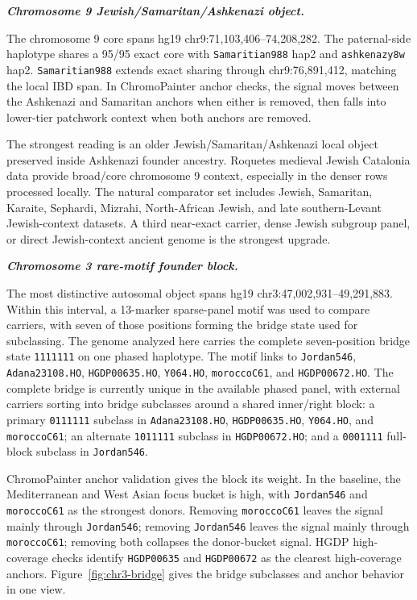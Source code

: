 \documentclass[11pt]{article}
\newcommand{\objectheading}[1]{%
  \par\addvspace{0.9\baselineskip}%
  \noindent\textbf{\textit{#1}}\par\nopagebreak\smallskip\noindent%
}
\begin{document}
\objectheading{Chromosome 9 Jewish/Samaritan/Ashkenazi object.}
The chromosome 9 core spans hg19 chr9:71,103,406--74,208,282. The paternal-side haplotype shares a 95/95 exact core with \texttt{Samaritian988} hap2 and \texttt{ashkenazy8w} hap2. \texttt{Samaritian988} extends exact sharing through chr9:76,891,412, matching the local IBD span. In ChromoPainter anchor checks, the signal moves between the Ashkenazi and Samaritan anchors when either is removed, then falls into lower-tier patchwork context when both anchors are removed.

The strongest reading is an older Jewish/Samaritan/Ashkenazi local object preserved inside Ashkenazi founder ancestry. Roquetes medieval Jewish Catalonia data provide broad/core chromosome 9 context, especially in the denser rows processed locally. The natural comparator set includes Jewish, Samaritan, Karaite, Sephardi, Mizrahi, North-African Jewish, and late southern-Levant Jewish-context datasets. A third near-exact carrier, dense Jewish subgroup panel, or direct Jewish-context ancient genome is the strongest upgrade.

\objectheading{Chromosome 3 rare-motif founder block.}
The most distinctive autosomal object spans hg19 chr3:47,002,931--49,291,883. Within this interval, a 13-marker sparse-panel motif was used to compare carriers, with seven of those positions forming the bridge state used for subclassing. The genome analyzed here carries the complete seven-position bridge state \texttt{1111111} on one phased haplotype. The motif links to \texttt{Jordan546}, \texttt{Adana23108.HO}, \texttt{HGDP00635.HO}, \texttt{Y064.HO}, \texttt{moroccoC61}, and \texttt{HGDP00672.HO}. The complete bridge is currently unique in the available phased panel, with external carriers sorting into bridge subclasses around a shared inner/right block: a primary \texttt{0111111} subclass in \texttt{Adana23108.HO}, \texttt{HGDP00635.HO}, \texttt{Y064.HO}, and \texttt{moroccoC61}; an alternate \texttt{1011111} subclass in \texttt{HGDP00672.HO}; and a \texttt{0001111} full-block subclass in \texttt{Jordan546}.

ChromoPainter anchor validation gives the block its weight. In the baseline, the Mediterranean and West Asian focus bucket is high, with \texttt{Jordan546} and \texttt{moroccoC61} as the strongest donors. Removing \texttt{moroccoC61} leaves the signal mainly through \texttt{Jordan546}; removing \texttt{Jordan546} leaves the signal mainly through \texttt{moroccoC61}; removing both collapses the donor-bucket signal. HGDP high-coverage checks identify \texttt{HGDP00635} and \texttt{HGDP00672} as the clearest high-coverage anchors. Figure~\ref{fig:chr3-bridge} gives the bridge subclasses and anchor behavior in one view.
\end{document}
